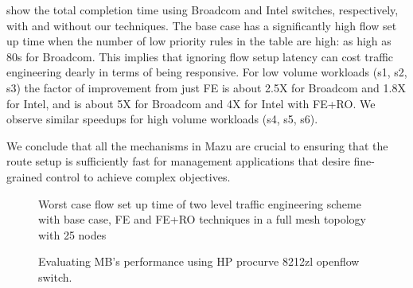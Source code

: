  show the total completion time using
Broadcom and Intel switches, respectively, with and without our techniques. The base case has a significantly high flow set up time when the number of low priority rules in the table are high: as high as 80s for Broadcom. This implies that ignoring flow setup latency can cost traffic engineering dearly in terms of being responsive.  For low volume workloads (s1, s2, s3) the factor of improvement from just FE is about 2.5X for Broadcom and 1.8X for Intel, and is about 5X for Broadcom and 4X for Intel with FE+RO. We observe similar speedups for high volume workloads (s4, s5, s6). 

We conclude that all the mechanisms in Mazu are crucial to ensuring that the
route setup is sufficiently fast for management applications that desire
fine-grained control to achieve complex objectives.




\begin{figure}
{}
  \vspace{-5pt}
\caption{Worst case flow set up time of two level traffic engineering scheme with base case, FE and FE+RO techniques in a full mesh topology with 25 nodes}
\label{qosResults}
\end{figure}

\iffalse

\begin{figure}[!tb]
\centering
{}
\caption{Evaluating MB's performance using HP procurve 8212zl openflow switch.}\label{MB_perf_hp}
\end{figure}


